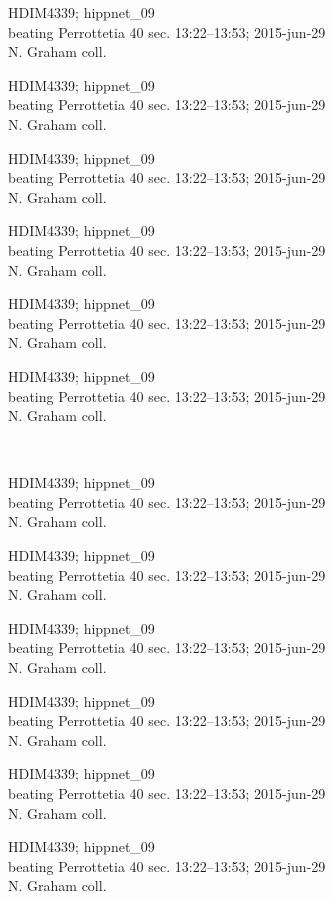 \documentclass[2pt]{extarticle}
\begin{document}
\noindent
\parbox{0.16\textwidth}{\tiny \raggedright \rule[-0.3\baselineskip]{0pt}{10pt}HDIM4339; hippnet\_09\\ beating Perrottetia 40 sec. 13:22--13:53; 2015-jun-29\\ N. Graham coll.}
\parbox{0.16\textwidth}{\tiny \raggedright \rule[-0.3\baselineskip]{0pt}{10pt}HDIM4339; hippnet\_09\\ beating Perrottetia 40 sec. 13:22--13:53; 2015-jun-29\\ N. Graham coll.}
\parbox{0.16\textwidth}{\tiny \raggedright \rule[-0.3\baselineskip]{0pt}{10pt}HDIM4339; hippnet\_09\\ beating Perrottetia 40 sec. 13:22--13:53; 2015-jun-29\\ N. Graham coll.}
\parbox{0.16\textwidth}{\tiny \raggedright \rule[-0.3\baselineskip]{0pt}{10pt}HDIM4339; hippnet\_09\\ beating Perrottetia 40 sec. 13:22--13:53; 2015-jun-29\\ N. Graham coll.}
\parbox{0.16\textwidth}{\tiny \raggedright \rule[-0.3\baselineskip]{0pt}{10pt}HDIM4339; hippnet\_09\\ beating Perrottetia 40 sec. 13:22--13:53; 2015-jun-29\\ N. Graham coll.}
\parbox{0.16\textwidth}{\tiny \raggedright \rule[-0.3\baselineskip]{0pt}{10pt}HDIM4339; hippnet\_09\\ beating Perrottetia 40 sec. 13:22--13:53; 2015-jun-29\\ N. Graham coll.} \\ 
\vspace{0.001in} 

\noindent
\parbox{0.16\textwidth}{\tiny \raggedright \rule[-0.3\baselineskip]{0pt}{10pt}HDIM4339; hippnet\_09\\ beating Perrottetia 40 sec. 13:22--13:53; 2015-jun-29\\ N. Graham coll.}
\parbox{0.16\textwidth}{\tiny \raggedright \rule[-0.3\baselineskip]{0pt}{10pt}HDIM4339; hippnet\_09\\ beating Perrottetia 40 sec. 13:22--13:53; 2015-jun-29\\ N. Graham coll.}
\parbox{0.16\textwidth}{\tiny \raggedright \rule[-0.3\baselineskip]{0pt}{10pt}HDIM4339; hippnet\_09\\ beating Perrottetia 40 sec. 13:22--13:53; 2015-jun-29\\ N. Graham coll.}
\parbox{0.16\textwidth}{\tiny \raggedright \rule[-0.3\baselineskip]{0pt}{10pt}HDIM4339; hippnet\_09\\ beating Perrottetia 40 sec. 13:22--13:53; 2015-jun-29\\ N. Graham coll.}
\parbox{0.16\textwidth}{\tiny \raggedright \rule[-0.3\baselineskip]{0pt}{10pt}HDIM4339; hippnet\_09\\ beating Perrottetia 40 sec. 13:22--13:53; 2015-jun-29\\ N. Graham coll.}
\parbox{0.16\textwidth}{\tiny \raggedright \rule[-0.3\baselineskip]{0pt}{10pt}HDIM4339; hippnet\_09\\ beating Perrottetia 40 sec. 13:22--13:53; 2015-jun-29\\ N. Graham coll.} \\ 
\vspace{0.001in} 
\end{document}
